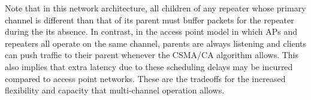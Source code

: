Note that in this network architecture, all children of any repeater whose primary channel is different than that of its parent must buffer packets for the repeater during the its absence. In contrast, in the access point model in which APs and repeaters all operate on the same channel, parents are always listening and clients can push traffic to their parent whenever the CSMA/CA algorithm allows. This also implies that extra latency due to these scheduling delays may be incurred compared to access point networks. These are the tradeoffs for the increased flexibility and capacity that multi-channel operation allows.





